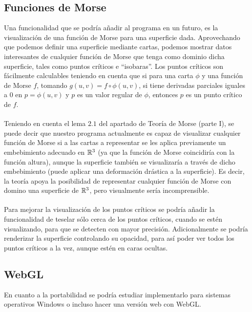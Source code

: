 \subsection*{Funciones de Morse}
Una funcionalidad que se podría añadir al programa en un futuro, es la visualización de una función de Morse para una superficie dada. Aprovechando que podemos definir una superficie mediante cartas, podemos mostrar datos interesantes de cualquier función de Morse que tenga como dominio dicha superficie, tales como puntos críticos e ``isobaras''. Los puntos críticos son fácilmente calculables teniendo en cuenta que si para una carta $\phi$ y una función de Morse $f$, tomando $g(u,v)=f \circ \phi (u,v)$, si tiene derivadas parciales iguales a $0$ en $p=\phi(u,v)$ y $p$ es un valor regular de $\phi$, entonces $p$ es un punto crítico de $f$.\\
\\Teniendo en cuenta el lema $2.1$ del apartado de Teoría de Morse (parte I), se puede decir que nuestro programa actualmente es capaz de visualizar cualquier función de Morse si a las cartas a representar se les aplica previamente un embebimiento adecuado en $\mathbb{R}^3$ (ya que la función de Morse coincidiría con la función altura), aunque la superficie también se visualizaría a través de dicho embebimiento (puede aplicar una deformación drástica a la superficie). Es decir, la teoría apoya la posibilidad de representar cualquier función de Morse con domino una superficie de $\mathbb{R}^3$, pero visualmente sería incomprensible.\\
\\Para mejorar la visualización de los puntos críticos se podría añadir la funcionalidad de teselar sólo cerca de los puntos críticos, cuando se estén visualizando, para que se detecten con mayor precisión. Adicionalmente se podría renderizar la superficie controlando su opacidad, para así poder ver todos los puntos críticos a la vez, aunque estén en caras ocultas.

\subsection*{WebGL}
En cuanto a la portabilidad se podría estudiar implementarlo para sistemas operativos Windows o incluso hacer una versión web con WebGL.\\

